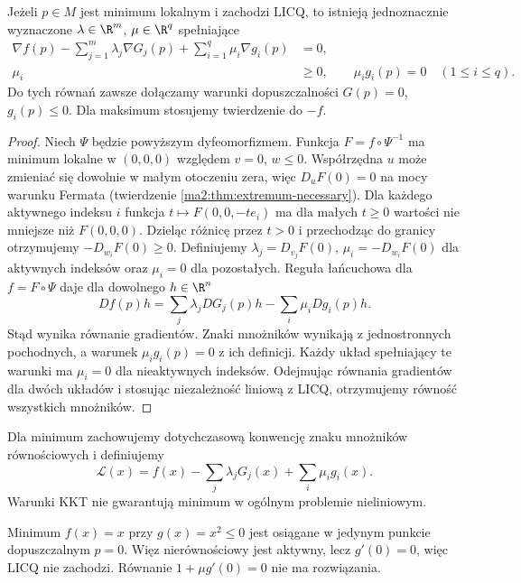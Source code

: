 \begin{twierdzenie}
\label{ma2:thm:kkt-licq}
Jeżeli $p\in M$ jest minimum lokalnym i zachodzi LICQ,
to istnieją jednoznacznie wyznaczone
$\lambda\in\R^m$, $\mu\in\R^q$ spełniające
\[
 \begin{aligned}
 \nabla f(p)-\sum_{j=1}^m\lambda_j\nabla G_j(p)
       +\sum_{i=1}^q\mu_i\nabla g_i(p)&=0,\\
 \mu_i&\ge0,\qquad
 \mu_i g_i(p)=0\quad(1\le i\le q).
 \end{aligned}
\]
Do tych równań zawsze dołączamy warunki
dopuszczalności $G(p)=0$, $g_i(p)\le0$.
Dla maksimum stosujemy twierdzenie do $-f$.
\end{twierdzenie}
\begin{proof}
Niech $\Psi$ będzie powyższym dyfeomorfizmem.
Funkcja $F=f\circ\Psi^{-1}$ ma minimum lokalne
w $(0,0,0)$ względem $v=0$, $w\le0$.
Współrzędna $u$ może zmieniać się dowolnie w małym
otoczeniu zera, więc $D_uF(0)=0$ na mocy warunku
Fermata (twierdzenie \ref{ma2:thm:extremum-necessary}).
Dla każdego aktywnego indeksu $i$ funkcja
$t\mapsto F(0,0,-te_i)$ ma dla małych $t\ge0$
wartości nie mniejsze niż $F(0,0,0)$. Dzieląc
różnicę przez $t>0$ i przechodząc do granicy
otrzymujemy $-D_{w_i}F(0)\ge0$.
Definiujemy $\lambda_j=D_{v_j}F(0)$,
$\mu_i=-D_{w_i}F(0)$ dla aktywnych indeksów
oraz $\mu_i=0$ dla pozostałych. Reguła łańcuchowa
dla $f=F\circ\Psi$ daje dla dowolnego $h\in\R^n$
\[
 Df(p)h=\sum_j\lambda_j DG_j(p)h
             -\sum_i\mu_i Dg_i(p)h.
\]
Stąd wynika równanie gradientów. Znaki mnożników
wynikają z jednostronnych pochodnych, a warunek
$\mu_i g_i(p)=0$ z ich definicji. Każdy układ
spełniający te warunki ma $\mu_i=0$ dla nieaktywnych
indeksów. Odejmując równania gradientów dla dwóch
układów i stosując niezależność liniową z LICQ,
otrzymujemy równość wszystkich mnożników.
\end{proof}

Dla minimum zachowujemy dotychczasową konwencję
znaku mnożników równościowych i definiujemy
\[
 \mathcal L(x)=f(x)-\sum_j\lambda_jG_j(x)
                        +\sum_i\mu_i g_i(x).
\]
Warunki KKT nie gwarantują minimum w ogólnym
problemie nieliniowym.

\begin{przyklad}
\label{ma2:ex:kkt-singular}
Minimum $f(x)=x$ przy $g(x)=x^2\le0$ jest osiągane
w jedynym punkcie dopuszczalnym $p=0$. Więz nierównościowy jest aktywny, lecz $g'(0)=0$,
więc LICQ nie zachodzi. Równanie
$1+\mu g'(0)=0$ nie ma rozwiązania.
\end{przyklad}

